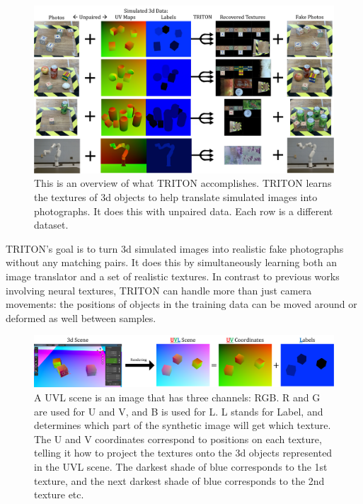 \documentclass{article}
\begin{document}
	\begin{figure}[H]
		\begin{center}
			\includegraphics[width=400pt]{../images/first_diagram.pdf}
		\end{center}
		\caption{
			This is an overview of what TRITON accomplishes.
			TRITON learns the textures of 3d objects to help translate simulated images into photographs. It does this with unpaired data. Each row is a different dataset.
			}
		\label{fig:first_diagram}
	\end{figure}



	TRITON's goal is to turn 3d simulated images into realistic fake photographs without any matching pairs.
	It does this by simultaneously learning both an image translator and a set of realistic textures.
	In contrast to previous works involving neural textures, TRITON can handle more than just camera movements:
	the positions of objects in the training data can be moved around or deformed as well between samples.


	\begin{figure}[H]
		\begin{center}
			\includegraphics[width=400pt]{../images/uvl_explanation_minimal.pdf}
		\end{center}
		\caption{
			A UVL scene is an image that has three channels: RGB.
			R and G are used for U and V, and B is used for L.
			L stands for Label, and determines which part of the synthetic image will get which texture.
			The U and V coordinates correspond to positions on each texture,
			telling it how to project the textures onto the 3d objects represented in the UVL scene.
			The darkest shade of blue corresponds to the 1st texture, and the next darkest shade of blue corresponds to the 2nd texture etc.
			}
		\label{fig:uvl_explanation}
	\end{figure}
\end{document}
